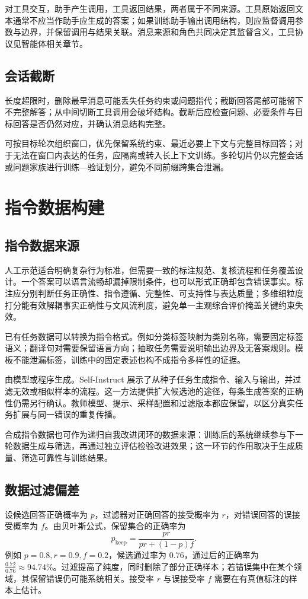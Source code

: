 \documentclass[../textbook.tex]{subfiles}
\begin{document}
对工具交互，助手产生调用，工具返回结果，两者属于不同来源。工具原始返回文本通常不应当作助手应生成的答案；如果训练助手输出调用结构，则应监督调用参数与边界，并保留调用与结果关联。消息来源和角色共同决定其监督含义，工具协议见智能体相关章节。

\subsection{会话截断}
长度超限时，删除最早消息可能丢失任务约束或问题指代；截断回答尾部可能留下不完整解答；从中间切断工具调用会破坏结构。截断后应检查问题、必要条件与目标回答是否仍然对应，并确认消息结构完整。

可按目标轮次组织窗口，优先保留系统约束、最近必要上下文与完整目标回答；对于无法在窗口内表达的任务，应隔离或转入长上下文训练。多轮切片仍以完整会话或问题家族进行训练—验证划分，避免不同前缀跨集合泄漏。

\section{指令数据构建}

\subsection{指令数据来源}
人工示范适合明确复杂行为标准，但需要一致的标注规范、复核流程和任务覆盖设计。一个答案可以语言流畅却漏掉限制条件，也可以形式正确却包含错误事实。标注应分别判断任务正确性、指令遵循、完整性、可支持性与表达质量；多维细粒度打分能有效解耦事实正确性与文风流利度，避免单一主观综合评价掩盖关键约束失效。

已有任务数据可以转换为指令格式。例如分类标签映射为类别名称，需要固定标签语义；翻译句对需要保留语言方向；抽取任务需要说明输出边界及无答案规则。模板不能泄漏标签，训练中的固定表述也构不成指令多样性的证据。

由模型或程序生成。Self-Instruct 展示了从种子任务生成指令、输入与输出，并过滤无效或相似样本的流程\cite{wang2023selfinstruct}。这一方法提供扩大候选池的途径，每条生成答案的正确性仍需另行确认。教师模型、提示、采样配置和过滤版本都应保留，以区分真实任务扩展与同一错误的重复传播。

合成指令数据也可作为递归自我改进闭环的数据来源：训练后的系统继续参与下一轮数据生成与筛选，再通过独立评估检验改进效果；这一环节的作用取决于生成质量、筛选可靠性与训练结果。

\subsection{数据过滤偏差}
设候选回答正确概率为 $p$，过滤器对正确回答的接受概率为 $r$，对错误回答的误接受概率为 $f$。由贝叶斯公式，保留集合的正确率为
\begin{equation}
 p_{\mathrm{keep}}=\frac{pr}{pr+(1-p)f}.
 \label{eq:sft-filter}
\end{equation}
例如 $p=0.8,r=0.9,f=0.2$，候选通过率为 $0.76$，通过后的正确率为 $\frac{0.72}{0.76}\approx94.74\%$。过滤提高了纯度，同时删除了部分正确样本；若错误集中在某个领域，其保留错误仍可能系统相关。接受率 $r$ 与误接受率 $f$ 需要在有真值标注的样本上估计。
\end{document}
